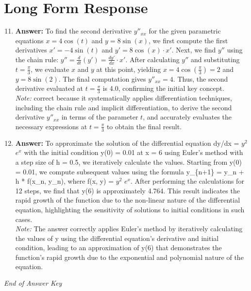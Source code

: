 \documentclass[12pt]{article}
\begin{document}
\section*{Long Form Response}
\begin{enumerate}[label=\arabic*.]
\setcounter{enumi}{10}
\item \textbf{Answer:} To find the second derivative \(y''_{xx}\) for the given parametric equations \(x = 4 \cos(t)\) and \(y = 8 \sin(x)\), we first compute the first derivatives \(x' = -4 \sin(t)\) and \(y' = 8 \cos(x) \cdot x'\). Next, we find \(y''\) using the chain rule: \(y'' = \frac{d}{dt}(y') = \frac{dy'}{dx} \cdot x'\). After calculating \(y''\) and substituting \(t = \frac{\pi}{3}\), we evaluate \(x\) and \(y\) at this point, yielding \(x = 4 \cos\left(\frac{\pi}{3}\right) = 2\) and \(y = 8 \sin(2)\). The final computation gives \(y''_{xx} = 4\). Thus, the second derivative evaluated at \(t = \frac{\pi}{3}\) is 4.0, confirming the initial key concept.
\\ \textit{Note:} correct because it systematically applies differentiation techniques, including the chain rule and implicit differentiation, to derive the second derivative \(y''_{xx}\) in terms of the parameter \(t\), and accurately evaluates the necessary expressions at \(t = \frac{\pi}{3}\) to obtain the final result.
\item \textbf{Answer:} To approximate the solution of the differential equation dy/dx = $y^2$ $e^x$ with the initial condition y(0) = 0.01 at x = 6 using Euler's method with a step size of h = 0.5, we iteratively calculate the values. Starting from y(0) = 0.01, we compute subsequent values using the formula y\_\{n+1\} = y\_n + h * f(x\_n, y\_n), where f(x, y) = $y^2$ $e^x$. After performing the calculations for 12 steps, we find that y(6) is approximately 4.764. This result indicates the rapid growth of the function due to the non-linear nature of the differential equation, highlighting the sensitivity of solutions to initial conditions in such cases.
\\ \textit{Note:} The answer correctly applies Euler's method by iteratively calculating the values of y using the differential equation's derivative and initial condition, leading to an approximation of y(6) that demonstrates the function's rapid growth due to the exponential and polynomial nature of the equation.
\end{enumerate}

\vfill
\noindent\textit{End of Answer Key}
\end{document}
